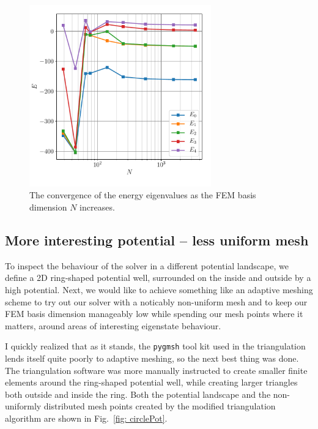 \documentclass[a4paper,12pt]{article}
\begin{document}
\begin{figure}[H]
\centering
\includegraphics[width=0.7\textwidth]{../figs/energy_convergence.pdf}
\caption{The convergence of the energy eigenvalues as the FEM basis dimension $N$ increases.}
\label{fig: gaussEigVals}
\end{figure}

\subsection{More interesting potential -- less uniform mesh}

To inspect the behaviour of the solver in a different potential landscape, we define a 2D ring-shaped potential well, surrounded on the inside and outside by a high potential. Next, we would like to achieve something like an adaptive meshing scheme to try out our solver with a noticably non-uniform mesh and to keep our FEM basis dimension manageably low while spending our mesh points where it matters, around areas of interesting eigenstate behaviour.

I quickly realized that as it stands, the \texttt{pygmsh} tool kit used in the triangulation lends itself quite poorly to adaptive meshing, so the next best thing was done. The triangulation software was more manually instructed to create smaller finite elements around the ring-shaped potential well, while creating larger triangles both outside and inside the ring. Both the potential landscape and the non-uniformly distributed mesh points created by the modified triangulation algorithm are shown in Fig.~\ref{fig: circlePot}.
\end{document}
